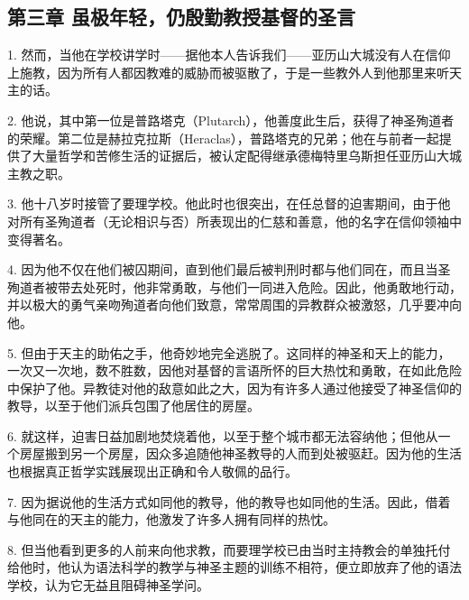 
\subsection{第三章 虽极年轻，仍殷勤教授基督的圣言}

1. 然而，当他在学校讲学时——据他本人告诉我们——亚历山大城没有人在信仰上施教，因为所有人都因教难的威胁而被驱散了，于是一些教外人到他那里来听天主的话。\par

2. 他说，其中第一位是普路塔克（Plutarch），他善度此生后，获得了神圣殉道者的荣耀。第二位是赫拉克拉斯（Heraclas），普路塔克的兄弟；他在与前者一起提供了大量哲学和苦修生活的证据后，被认定配得继承德梅特里乌斯担任亚历山大城主教之职。\par

3. 他十八岁时接管了要理学校。他此时也很突出，在任总督的迫害期间，由于他对所有圣殉道者（无论相识与否）所表现出的仁慈和善意，他的名字在信仰领袖中变得著名。\par

4. 因为他不仅在他们被囚期间，直到他们最后被判刑时都与他们同在，而且当圣殉道者被带去处死时，他非常勇敢，与他们一同进入危险。因此，他勇敢地行动，并以极大的勇气亲吻殉道者向他们致意，常常周围的异教群众被激怒，几乎要冲向他。\par

5. 但由于天主的助佑之手，他奇妙地完全逃脱了。这同样的神圣和天上的能力，一次又一次地，数不胜数，因他对基督的言语所怀的巨大热忱和勇敢，在如此危险中保护了他。异教徒对他的敌意如此之大，因为有许多人通过他接受了神圣信仰的教导，以至于他们派兵包围了他居住的房屋。\par

6. 就这样，迫害日益加剧地焚烧着他，以至于整个城市都无法容纳他；但他从一个房屋搬到另一个房屋，因众多追随他神圣教导的人而到处被驱赶。因为他的生活也根据真正哲学实践展现出正确和令人敬佩的品行。\par

7. 因为据说他的生活方式如同他的教导，他的教导也如同他的生活。因此，借着与他同在的天主的能力，他激发了许多人拥有同样的热忱。\par

8. 但当他看到更多的人前来向他求教，而要理学校已由当时主持教会的单独托付给他时，他认为语法科学的教学与神圣主题的训练不相符，便立即放弃了他的语法学校，认为它无益且阻碍神圣学问。\par

